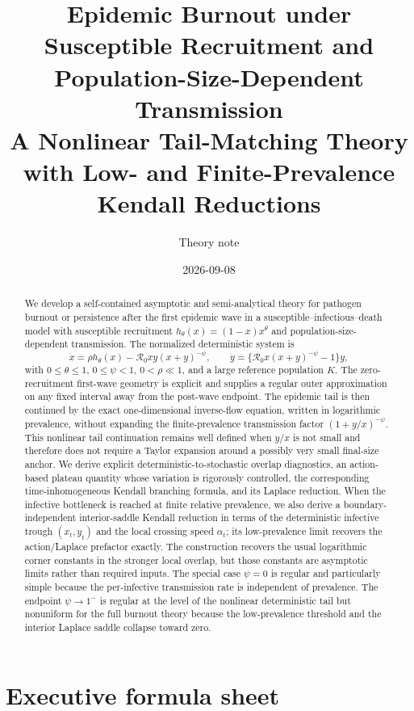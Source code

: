 \documentclass[11pt]{article}
\title{Epidemic Burnout under Susceptible Recruitment and Population-Size-Dependent Transmission\\[0.4em]\large A Nonlinear Tail-Matching Theory with Low- and Finite-Prevalence Kendall Reductions}
\author{Theory note}
\date{2026-09-08}
\newcommand{\Rzero}{\mathcal R_0}
\begin{document}
\maketitle

\begin{abstract}
We develop a self-contained asymptotic and semi-analytical theory for pathogen burnout or persistence after the first epidemic wave in a susceptible--infectious--death model with susceptible recruitment $h_\theta(x)=(1-x)x^\theta$ and population-size-dependent transmission. The normalized deterministic system is
\[
\dot x=\rho h_\theta(x)-\Rzero xy(x+y)^{-\psi},
\qquad
\dot y=\{\Rzero x(x+y)^{-\psi}-1\}y,
\]
with $0\leq\theta\leq1$, $0\leq\psi<1$, $0<\rho\ll1$, and a large reference population $K$. The zero-recruitment first-wave geometry is explicit and supplies a regular outer approximation on any fixed interval away from the post-wave endpoint. The epidemic tail is then continued by the exact one-dimensional inverse-flow equation, written in logarithmic prevalence, without expanding the finite-prevalence transmission factor $(1+y/x)^{-\psi}$. This nonlinear tail continuation remains well defined when $y/x$ is not small and therefore does not require a Taylor expansion around a possibly very small final-size anchor. We derive explicit deterministic-to-stochastic overlap diagnostics, an action-based plateau quantity whose variation is rigorously controlled, the corresponding time-inhomogeneous Kendall branching formula, and its Laplace reduction. When the infective bottleneck is reached at finite relative prevalence, we also derive a boundary-independent interior-saddle Kendall reduction in terms of the deterministic infective trough $(x_t,y_t)$ and the local crossing speed $\alpha_t$; its low-prevalence limit recovers the action/Laplace prefactor exactly. The construction recovers the usual logarithmic corner constants in the stronger local overlap, but those constants are asymptotic limits rather than required inputs. The special case $\psi=0$ is regular and particularly simple because the per-infective transmission rate is independent of prevalence. The endpoint $\psi\to1^-$ is regular at the level of the nonlinear deterministic tail but nonuniform for the full burnout theory because the low-prevalence threshold and the interior Laplace saddle collapse toward zero.
\end{abstract}

\tableofcontents
\clearpage

\section{Executive formula sheet}
\end{document}
